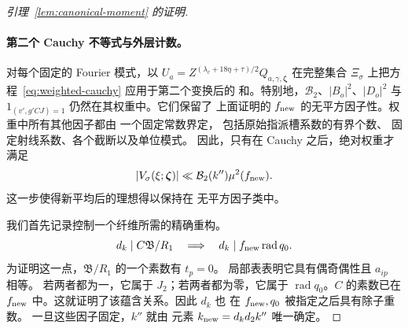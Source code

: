 \documentclass[11pt,a4paper]{article}
\numberwithin{equation}{section}
\numberwithin{figure}{section}
\theoremstyle{definition}
\theoremstyle{remark}
\begin{document}
\begin{proof}[引理~\ref{lem:canonical-moment} 的证明]
\paragraph{第二个 Cauchy 不等式与外层计数。}
对每个固定的 Fourier 模式，以
\(U_a=Z^{(\lambda_c+18\eta+\tau)/2}Q_{a,\gamma,\boldsymbol\zeta}\)
在完整集合 \(\Xi_\sigma\) 上把方程~\eqref{eq:weighted-cauchy} 应用于第二个变换后的
和。特别地，\(\mathcal B_2\)、\(|B_o|^2\)、\(|D_o|^2\) 与
\(1_{(v',g'CJ)=1}\) 仍然在其权重中。它们保留了
上面证明的 \(f_{\rm new}\) 的无平方因子性。权重中所有其他因子都由
一个固定常数界定，
包括原始指派槽系数的有界个数、
固定射线系数、各个截断以及单位模式。
因此，只有在 Cauchy 之后，绝对权重才满足
\[
 |V_\sigma(\xi;\boldsymbol\zeta)|
 \ll \mathcal B_2(k'')\mu^2(f_{\rm new}).
\]
这一步使得新平均后的理想得以保持在
无平方因子类中。

我们首先记录控制一个纤维所需的精确重构。
\begin{equation}\label{eq:poisson-divisor-reconstruction}
 d_k\mid C\mathfrak B/R_1
 \quad\Longrightarrow\quad
 d_k\mid f_{\rm new}\operatorname{rad}q_0.
\end{equation}
为证明这一点，\(\mathfrak B/R_1\) 的一个素数有 \(t_p=0\)。
局部表表明它具有偶奇偶性且 \(a_{ip}\) 相等。
若两者都为一，它属于 \(J_2\)；若两者都为零，它属于
\(\operatorname{rad}q_0\)。\(C\) 的素数已在
\(f_{\rm new}\) 中。这就证明了该蕴含关系。因此 \(d_k\) 也
在 \(f_{\rm new},q_0\) 被指定之后具有除子重数。
一旦这些因子固定，\(k''\) 就由
元素 \(k_{\rm new}=d_kd_2k''\) 唯一确定。


\end{proof}
\end{document}
